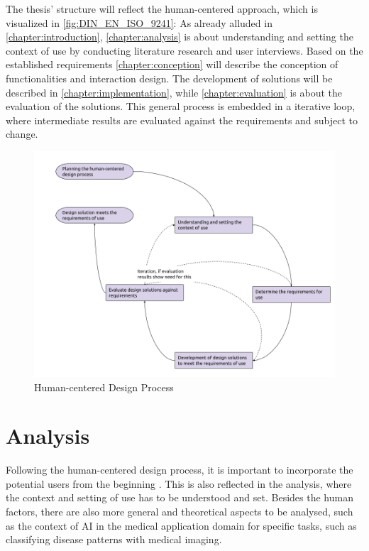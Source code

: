 \documentclass[11pt,a4paper,english]{scrreprt}
\begin{document}
The thesis' structure will reflect the human-centered approach, which is visualized in \autoref{fig:DIN_EN_ISO_9241}: As already alluded in \autoref{chapter:introduction}, \autoref{chapter:analysis} is about understanding and setting the context of use by conducting literature research and user interviews. Based on the established requirements \autoref{chapter:conception} will describe the conception of functionalities and interaction design. The development of solutions will be described in \autoref{chapter:implementation}, while \autoref{chapter:evaluation} is about the evaluation of the solutions. This general process is embedded in a iterative loop, where intermediate results are evaluated against the requirements and subject to change.
\begin{figure}[htbp]
    \centering
    \includegraphics[width=\textwidth]{img/figures/DIN_EN_ISO_9241-210.png}
    \caption{Human-centered Design Process \parencite{DIN}}
    \label{fig:DIN_EN_ISO_9241}
\end{figure}

\newpage
\chapter{Analysis}\label{chapter:analysis}
Following the human-centered design process, it is important to incorporate the potential users from the beginning \parencite{harte_human-centered_2017}. This is also reflected in the analysis, where the context and setting of use has to be understood and set. Besides the human factors, there are also more general and theoretical aspects to be analysed, such as the context of AI in the medical application domain for specific tasks, such as classifying disease patterns with medical imaging.
\end{document}
